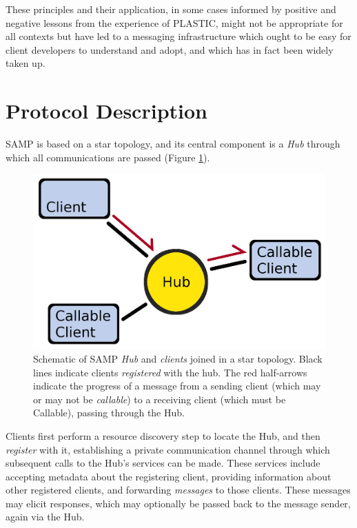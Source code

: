 \documentclass[5p]{elsarticle}
\begin{document}
These principles and their application, in some cases informed
by positive and negative lessons from the experience of PLASTIC,
might not be appropriate for all contexts
but have led to a messaging infrastructure
which ought to be easy for client developers to understand and adopt,
and which has in fact been widely taken up.

\section{Protocol Description} \label{sec:protocol}

SAMP is based on a star topology, and its central component is a
{\em Hub\/} through which all communications are passed
(Figure \ref{fig:topology}).
\begin{figure}
\begin{center}
\includegraphics[width=0.9\columnwidth]{topology-a.png}
\end{center}
\caption{\label{fig:topology}
Schematic of SAMP {\em Hub\/} and {\em clients\/} joined in a star topology.
Black lines indicate clients {\em registered\/} with the hub.
The red half-arrows indicate the progress of a message
from a sending client (which may or may not be {\em callable\/})
to a receiving client (which must be Callable),
passing through the Hub.
}
\end{figure}
Clients first perform a resource discovery step to locate the Hub,
and then {\em register\/} with it, establishing a private communication
channel through which subsequent calls to the Hub's services can be made.
These services include accepting metadata about the registering client,
providing information about other registered clients,
and forwarding {\em messages\/} to those clients.
These messages may elicit responses, which may optionally be passed
back to the message sender, again via the Hub.
\end{document}
